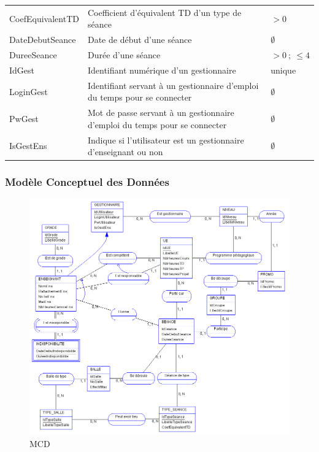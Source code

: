 \documentclass{article}
\begin{document}
\begin{tabular}{|p{4cm}|p{8cm}|p{5cm}|}
  CoefEquivalentTD & Coefficient d'équivalent TD d'un type de séance & $> 0$ \\

  DateDebutSeance & Date de début d'une séance & $\emptyset$ \\

  DureeSeance & Durée d'une séance & $> 0\ ;\ \leq 4$ \\

  IdGest & Identifiant numérique d'un gestionnaire & unique \\

  LoginGest & Identifiant servant à un gestionnaire d'emploi du temps pour se connecter & $\emptyset$ \\

  PwGest & Mot de passe servant à un gestionnaire d'emploi du temps pour se connecter & $\emptyset$ \\

  IsGestEns & Indique si l'utilisateur est un gestionnaire d'enseignant ou non & $\emptyset$ \\

  \hline
\end{tabular}

\newpage

\subsubsection{Modèle Conceptuel des Données}
\begin{figure}[h!]
\hspace*{-1.1in}
\includegraphics[scale=0.9]{img/MCD.png}
\caption{MCD}
\end{figure}
\end{document}
